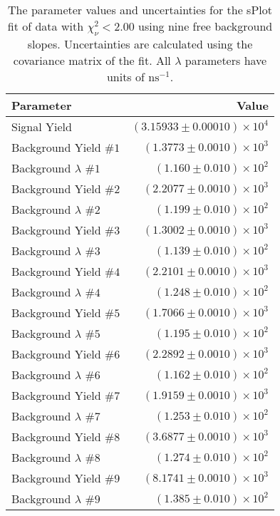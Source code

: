 
\begin{table}[ht]
    \begin{center}
        \begin{tabular}{lr}\toprule
            Parameter & Value \\\midrule
            Signal Yield & $(3.15933 \pm 0.00010) \times 10^{4}$ \\
            Background Yield $\#1$ & $(1.3773 \pm 0.0010) \times 10^{3}$ \\
            Background $\lambda$ $\#1$ & $(1.160 \pm 0.010) \times 10^{2}$ \\
            Background Yield $\#2$ & $(2.2077 \pm 0.0010) \times 10^{3}$ \\
            Background $\lambda$ $\#2$ & $(1.199 \pm 0.010) \times 10^{2}$ \\
            Background Yield $\#3$ & $(1.3002 \pm 0.0010) \times 10^{3}$ \\
            Background $\lambda$ $\#3$ & $(1.139 \pm 0.010) \times 10^{2}$ \\
            Background Yield $\#4$ & $(2.2101 \pm 0.0010) \times 10^{3}$ \\
            Background $\lambda$ $\#4$ & $(1.248 \pm 0.010) \times 10^{2}$ \\
            Background Yield $\#5$ & $(1.7066 \pm 0.0010) \times 10^{3}$ \\
            Background $\lambda$ $\#5$ & $(1.195 \pm 0.010) \times 10^{2}$ \\
            Background Yield $\#6$ & $(2.2892 \pm 0.0010) \times 10^{3}$ \\
            Background $\lambda$ $\#6$ & $(1.162 \pm 0.010) \times 10^{2}$ \\
            Background Yield $\#7$ & $(1.9159 \pm 0.0010) \times 10^{3}$ \\
            Background $\lambda$ $\#7$ & $(1.253 \pm 0.010) \times 10^{2}$ \\
            Background Yield $\#8$ & $(3.6877 \pm 0.0010) \times 10^{3}$ \\
            Background $\lambda$ $\#8$ & $(1.274 \pm 0.010) \times 10^{2}$ \\
            Background Yield $\#9$ & $(8.1741 \pm 0.0010) \times 10^{3}$ \\
            Background $\lambda$ $\#9$ & $(1.385 \pm 0.010) \times 10^{2}$ \\\bottomrule
        \end{tabular}
        \caption{The parameter values and uncertainties for the sPlot fit of data with $\chi^2_\nu < 2.00$ using nine free background slopes. Uncertainties are calculated using the covariance matrix of the fit. All $\lambda$ parameters have units of $\si{\nano\second}^{-1}$.}\label{tab:splot-fit-results-chisqdof-2.00-free-9}
    \end{center}
\end{table}

